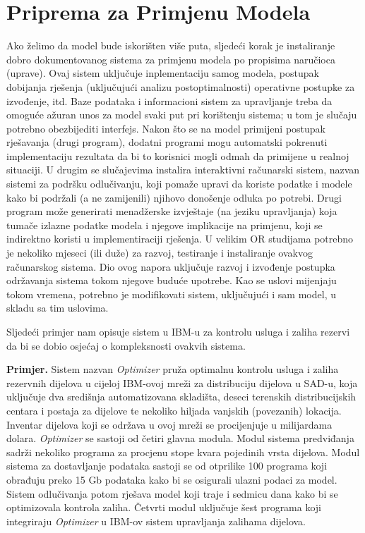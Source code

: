 \documentclass[a4paper, utf8, 11pt, colorlinks]{book}
\begin{document}
 \section{Priprema za Primjenu Modela}
 Ako želimo da model bude iskorišten više puta, sljedeći  korak je instaliranje dobro dokumentovanog sistema za primjenu modela po propisima naručioca (uprave). Ovaj sistem uključuje inplementaciju samog modela, postupak dobijanja rješenja (uključujući analizu postoptimalnosti) operativne postupke za izvođenje, itd. %
 Baze podataka i informacioni sistem za upravljanje treba da omoguće ažuran unos za model svaki put pri korištenju sistema; u tom je slučaju potrebno obezbijediti interfejs. Nakon što se na model primijeni postupak rješavanja (drugi program), dodatni  programi mogu automatski pokrenuti implementaciju rezultata da bi to korisnici mogli odmah da primijene u realnoj situaciji. U drugim se slučajevima instalira interaktivni računarski sistem,  nazvan sistemi za podršku odlučivanju, koji pomaže upravi da koriste podatke i modele kako bi podržali (a ne zamijenili) njihovo donošenje odluka po potrebi. Drugi program može generirati menadžerske izvještaje (na jeziku upravljanja) koja tumače izlazne podatke modela i njegove implikacije na primjenu, koji se indirektno koristi u implementiraciji rješenja.  U velikim OR studijama potrebno je nekoliko mjeseci (ili duže) za razvoj, testiranje i instaliranje ovakvog računarskog sistema. Dio ovog napora uključuje razvoj i izvođenje postupka održavanja sistema  tokom njegove buduće upotrebe. Kao se uslovi mijenjaju tokom vremena, potrebno je  modifikovati sistem, uključujući i sam model, u skladu sa tim uslovima.  

Sljedeći primjer nam opisuje sistem u IBM-u za kontrolu usluga i zaliha rezervi da bi se dobio osjećaj o kompleksnosti ovakvih sistema.  

\textbf{Primjer.}
 Sistem nazvan \emph{Optimizer} pruža optimalnu kontrolu usluga i zaliha rezervnih dijelova u cijeloj IBM-ovoj mreži za distribuciju dijelova u SAD-u, koja uključuje dva središnja
automatizovana skladišta, deseci terenskih distribucijskih centara i postaja za dijelove te nekoliko hiljada vanjskih (povezanih) lokacija. Inventar dijelova koji se održava u ovoj mreži se procijenjuje u milijardama dolara. \emph{Optimizer} se sastoji od četiri glavna modula. Modul sistema predviđanja sadrži nekoliko programa za procjenu stope kvara pojedinih vrsta dijelova. Modul sistema za dostavljanje podataka sastoji se od otprilike 100 programa koji    obrađuju
preko 15 Gb podataka kako bi se osigurali ulazni podaci za model. Sistem odlučivanja potom rješava model koji traje i  sedmicu dana kako bi se optimizovala kontrola zaliha. Četvrti modul uključuje šest programa koji integriraju \emph{Optimizer} u IBM-ov sistem upravljanja zalihama dijelova. %
\end{document}
